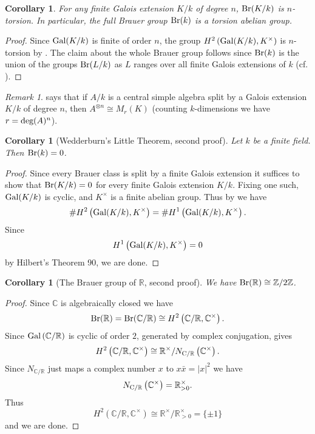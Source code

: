 \documentclass[11pt]{amsart}
\numberwithin{equation}{section}
\newtheorem{cor}[equation]{Corollary}
\theoremstyle{remark}
\newtheorem{remark}[equation]{Remark}
\theoremstyle{remark}
\theoremstyle{remark}
\theoremstyle{definition}
\theoremstyle{definition}
\theoremstyle{definition}
\theoremstyle{definition}
\theoremstyle{definition}
\theoremstyle{definition}
\begin{document}
\begin{cor} \label{brauer as torsion}
For any finite Galois extension $K/k$ of degree $n$, $\textup{Br}(K/k)$ is $n$-torsion. In particular, the full Brauer group $\textup{Br}(k)$ is a torsion abelian group. 
\end{cor}

\begin{proof}
Since $\textup{Gal}(K/k)$ is finite of order $n$, the group $H^2\left(\textup{Gal}(K/k),K^\times\right)$ is $n$-torsion by . The claim about the whole Brauer group follows since $\textup{Br}(k)$ is the union of the groups $\textup{Br}(L/k)$ as $L$ ranges over all finite Galois extensions of $k$ (cf. ).
\end{proof}

\begin{remark}
 says that if $A/k$ is a central simple algebra split by a Galois extension $K/k$ of degree $n$, then $A^{\otimes n}\cong M_r(K)$ (counting $k$-dimensions we have $r=\textup{deg}(A)^n$).  
\end{remark}

\begin{cor}[Wedderburn's Little Theorem, second proof]
Let $k$ be a finite field. Then $\textup{Br}(k)=0$.
\end{cor}

\begin{proof}
Since every Brauer class is split by a finite Galois extension it suffices to show that $\textup{Br}(K/k)=0$ for every finite Galois extension $K/k$. Fixing one such, $\textup{Gal}(K/k)$ is cyclic, and $K^\times$ is a finite abelian group. Thus by  we have
\[\#H^2\left(\textup{Gal}(K/k),K^\times\right)=\#H^1\left(\textup{Gal}(K/k),K^\times\right).\]
Since \[H^1\left(\textup{Gal}(K/k),K^\times\right)=0\] by Hilbert's Theorem 90, we are done.
\end{proof}

\begin{cor}[The Brauer group of $\mathbb{R}$, second proof]
We have $\textup{Br}(\mathbb{R})\cong \mathbb{Z}/2\mathbb{Z}$.
\end{cor}

\begin{proof}
Since $\mathbb{C}$ is algebraically closed we have \[\textup{Br}(\mathbb{R})=\textup{Br}(\mathbb{C}/\mathbb{R})\cong H^2\left(\mathbb{C}/\mathbb{R},\mathbb{C}^{\times}\right).\]
 Since $\textup{Gal}\left(\mathbb{C}/\mathbb{R}\right)$ is cyclic of order $2$, generated by complex conjugation,   gives
 \[H^2\left(\mathbb{C}/\mathbb{R},\mathbb{C}^{\times}\right)\cong \mathbb{R}^{\times}/N_{\textup{C}/\mathbb{R}}\left(\mathbb{C}^{\times}\right).\]
 Since $N_{\mathbb{C}/\mathbb{R}}$ just maps a complex number $x$ to $x\bar{x}=|x|^2$ we have 
 \[N_{\textup{C}/\mathbb{R}}\left(\mathbb{C}^{\times}\right)=\mathbb{R}^\times_{>0}.\]
 Thus 
 \[H^2\left(\mathbb{C}/\mathbb{R},\mathbb{C}^{\times}\right)\cong \mathbb{R}^\times/\mathbb{R}^\times_{>0}=\{\pm 1\}\]
 and we are done.
\end{proof}
\end{document}
